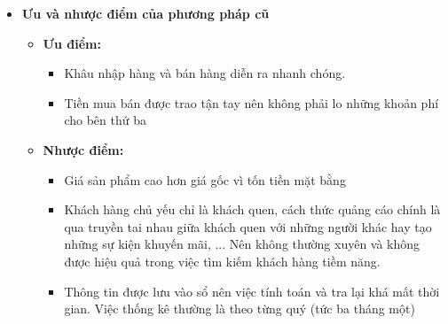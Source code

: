 \begin{itemize}
\begin{itemize}
	      \end{itemize}
	\item\textbf{Ưu và nhược điểm của phương pháp cũ}\par
	      \begin{itemize}
		      \item\textbf{Ưu điểm:}
		            \begin{itemize}
			            \item Khâu nhập hàng và bán hàng diễn ra nhanh chóng.
			            \item Tiền mua bán được trao tận tay nên không phải lo những khoản phí cho bên thứ ba
		            \end{itemize}
		      \item\textbf{Nhược điểm:}
		            \begin{itemize}
			            \item Giá sản phẩm cao hơn giá gốc vì tốn tiền mặt bằng
			            \item Khách hàng chủ yếu chỉ là khách quen, cách thức quảng cáo chính là qua truyền tai nhau giữa khách quen với những người khác hay tạo những sự kiện khuyến mãi, ... Nên không thường xuyên và không được hiệu quả trong việc tìm kiếm khách hàng tiềm năng.
			            \item Thông tin được lưu vào sổ nên việc tính toán và tra lại khá mất thời gian. Việc thống kê thường là theo từng quý (tức ba tháng một)
		            \end{itemize}
	      \end{itemize}
\end{itemize}
